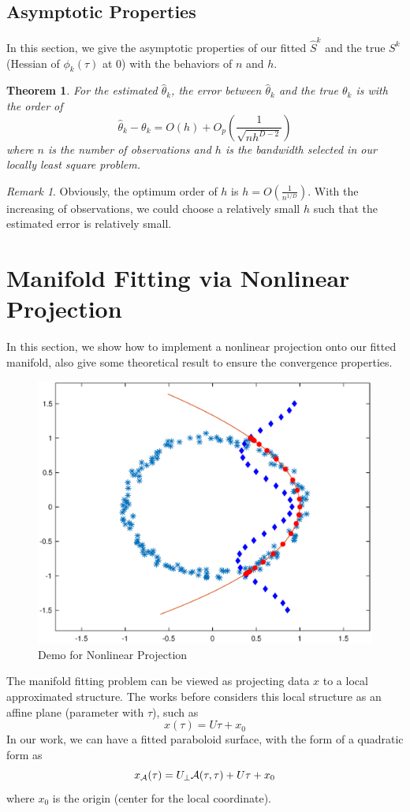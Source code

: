 \documentclass[aos,preprint]{imsart}
\newtheorem{theorem}{Theorem}[section]
\theoremstyle{remark}
\newtheorem*{remark}{Remark}
\begin{document}
\subsection{Asymptotic Properties}
In this section, we give the asymptotic properties of our fitted $\hat{S}^k$ and the true $S^k$ (Hessian of $\phi_k(\tau)$ at $0$) with the behaviors of $n$ and $h$.
\begin{theorem}
For the estimated $\hat{\theta}_k$, the error between $\hat{\theta}_k$ and the true $\theta_k$ is with the order of 
\[
\hat{\theta}_k - \theta_k = O(h) +O_p(\frac{1}{\sqrt{nh^{D-2}}})
\] 
where $n$ is the number of observations and $h$ is the bandwidth selected in our locally least square problem.
\end{theorem}
\begin{remark}
Obviously, the optimum order of $h$ is $h=O(\frac{1}{n^{1/D}})$.  With the increasing of observations, we could choose a relatively small $h$ such that the estimated error is relatively small.
\end{remark}

\section{Manifold Fitting via Nonlinear Projection}
In this section, we show how to implement a nonlinear projection onto our fitted manifold, also give some theoretical result to ensure the convergence properties.

\begin{figure}[t] %
   \centering
   \includegraphics[width=0.6\linewidth]{demo3.eps} 
   \caption{Demo for Nonlinear Projection }
   \label{fig:example}
\end{figure}

The manifold fitting problem can be viewed as projecting data $x$ to a local approximated structure. The works before considers this local structure as an affine plane (parameter with $\tau$), such as
\[
 x(\tau)  =  U \tau +x_0
\]
In our work, we can have a fitted paraboloid surface, with the form of a quadratic form as
\begin{equation}\label{manifold_representation}
x_{\cal A}(\tau) = U_{\perp} {\cal A} (\tau,\tau) + U \tau +x_0
\end{equation}
where $x_0$ is the origin (center for the local coordinate).
\end{document}
